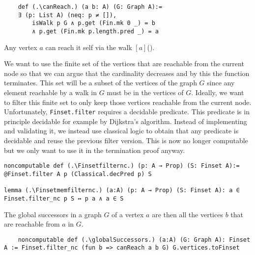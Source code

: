 \begin{lstlisting}
    def (.\canReach.) (a b: A) (G: Graph A):= 
    ∃ (p: List A) (neq: p ≠ []), 
        isWalk p G ∧ p.get (Fin.mk 0 _) = b 
        ∧ p.get (Fin.mk p.length.pred _) = a
\end{lstlisting}

Any vertex $a$ can reach it self via the walk $[a]$(\canReachrefl).

We want to use the finite set of the vertices that are reachable from the current node so that we can argue that the cardinality decreases and by this the function terminates. This set will be a subset of the vertices of the graph $G$ since any element reachable by a walk in $G$ must be in the vertices of $G$. Ideally, we want to filter this finite set to only keep those vertices reachable from the current node. Unfortunately, \lstinline|Finset.filter| requires a decidable predicate. This predicate is in principle decidable for example by Dijkstra's algorithm. Instead of implementing and validating it, we instead use classical logic to obtain that any predicate is decidable and reuse the previous filter version. This is now no longer computable but we only want to use it in the termination proof anyway.

\begin{lstlisting}
noncomputable def (.\Finsetfilternc.) (p: A → Prop) (S: Finset A):= @Finset.filter A p (Classical.decPred p) S

lemma (.\Finsetmemfilternc.) (a:A) (p: A → Prop) (S: Finset A): a ∈ Finset.filter_nc p S ↔ p a ∧ a ∈ S
\end{lstlisting}

The global successors in a graph $G$ of a vertex $a$ are then all the vertices $b$ that are reachable from $a$ in $G$.

\begin{lstlisting}
    noncomputable def (.\globalSuccessors.) (a:A) (G: Graph A): Finset A := Finset.filter_nc (fun b => canReach a b G) G.vertices.toFinset
\end{lstlisting}

